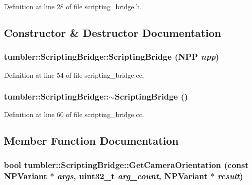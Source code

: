Definition at line 28 of file scripting\_\-bridge.h.



\subsection{Constructor \& Destructor Documentation}
\hypertarget{classtumbler_1_1_scripting_bridge_aa7abb8784b22a793d795e872841b4bac}{
\subsubsection[{ScriptingBridge}]{\setlength{\rightskip}{0pt plus 5cm}tumbler::ScriptingBridge::ScriptingBridge ({\bf NPP} {\em npp})}}
\label{classtumbler_1_1_scripting_bridge_aa7abb8784b22a793d795e872841b4bac}


Definition at line 54 of file scripting\_\-bridge.cc.

\hypertarget{classtumbler_1_1_scripting_bridge_abe0d3eec9a772e0bc7f906cbc432d58d}{
\subsubsection[{$\sim$ScriptingBridge}]{\setlength{\rightskip}{0pt plus 5cm}tumbler::ScriptingBridge::$\sim$ScriptingBridge ()}}
\label{classtumbler_1_1_scripting_bridge_abe0d3eec9a772e0bc7f906cbc432d58d}


Definition at line 60 of file scripting\_\-bridge.cc.



\subsection{Member Function Documentation}
\hypertarget{classtumbler_1_1_scripting_bridge_ace2d208ee47d10881e48945a1b9deb1e}{
\subsubsection[{GetCameraOrientation}]{\setlength{\rightskip}{0pt plus 5cm}bool tumbler::ScriptingBridge::GetCameraOrientation (const NPVariant $\ast$ {\em args}, \/  uint32\_\-t {\em arg\_\-count}, \/  NPVariant $\ast$ {\em result})}}
\label{classtumbler_1_1_scripting_bridge_ace2d208ee47d10881e48945a1b9deb1e}


